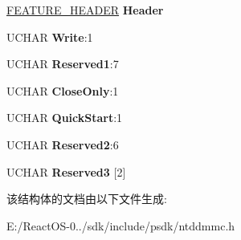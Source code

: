 \begin{DoxyCompactItemize}
\item 
\mbox{\label{struct___f_e_a_t_u_r_e___d_a_t_a___d_v_d___p_l_u_s___r_w___d_u_a_l___l_a_y_e_r_a8e7bf8cdc1aa73bf9f6cf6c1df9822e6}} 
\hyperlink{struct___f_e_a_t_u_r_e___h_e_a_d_e_r}{F\+E\+A\+T\+U\+R\+E\+\_\+\+H\+E\+A\+D\+ER} {\bfseries Header}
\item 
\mbox{\label{struct___f_e_a_t_u_r_e___d_a_t_a___d_v_d___p_l_u_s___r_w___d_u_a_l___l_a_y_e_r_a947a8fa67f862a01451c9bbb51299ddd}} 
U\+C\+H\+AR {\bfseries Write}\+:1
\item 
\mbox{\label{struct___f_e_a_t_u_r_e___d_a_t_a___d_v_d___p_l_u_s___r_w___d_u_a_l___l_a_y_e_r_acebb8a6190a47a37c10f0ef13064a08b}} 
U\+C\+H\+AR {\bfseries Reserved1}\+:7
\item 
\mbox{\label{struct___f_e_a_t_u_r_e___d_a_t_a___d_v_d___p_l_u_s___r_w___d_u_a_l___l_a_y_e_r_a1dd98d73c4417a3c25ec8399cfacea68}} 
U\+C\+H\+AR {\bfseries Close\+Only}\+:1
\item 
\mbox{\label{struct___f_e_a_t_u_r_e___d_a_t_a___d_v_d___p_l_u_s___r_w___d_u_a_l___l_a_y_e_r_affc278c6e6a230688c7ee75aac69eb7a}} 
U\+C\+H\+AR {\bfseries Quick\+Start}\+:1
\item 
\mbox{\label{struct___f_e_a_t_u_r_e___d_a_t_a___d_v_d___p_l_u_s___r_w___d_u_a_l___l_a_y_e_r_ac9ffd5b5785281885e4a83f66696f4e5}} 
U\+C\+H\+AR {\bfseries Reserved2}\+:6
\item 
\mbox{\label{struct___f_e_a_t_u_r_e___d_a_t_a___d_v_d___p_l_u_s___r_w___d_u_a_l___l_a_y_e_r_a3591173c96c7c6f1fe592468cd63a71d}} 
U\+C\+H\+AR {\bfseries Reserved3} \mbox{[}2\mbox{]}
\end{DoxyCompactItemize}


该结构体的文档由以下文件生成\+:\begin{DoxyCompactItemize}
\item 
E\+:/\+React\+O\+S-\/0../sdk/include/psdk/ntddmmc.\+h\end{DoxyCompactItemize}
